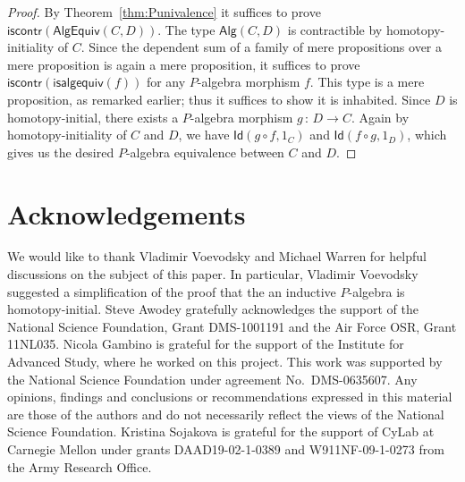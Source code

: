 \documentclass[10pt,a4paper,oneside,reqno]{amsart}
\theoremstyle{mythm}
\theoremstyle{mydef}
\theoremstyle{myrmk}
\newcommand{\co}{\,{:}\,}
\newcommand{\iscontr}{\mathsf{iscontr}}
\newcommand{\Id}{\mathsf{Id}}
\newcommand{\Palg}{\mathsf{Alg}}
\newcommand{\isalgequiv}{\mathsf{isalgequiv}}
\newcommand{\AlgEquiv}{\mathsf{AlgEquiv}}
\begin{document}
\begin{proof}
By Theorem~\ref{thm:Punivalence} it suffices to prove $\iscontr(\AlgEquiv(C,D))$. The type $\Palg(C,D)$ is contractible by homotopy-initiality of $C$. Since the dependent sum of a family of mere propositions over a mere proposition is again a mere proposition, it suffices to prove $\iscontr(\isalgequiv(f))$ for any $P$-algebra morphism $f$. This type is a mere proposition, as remarked earlier; thus it suffices to show it is inhabited.
Since $D$ is homotopy-initial, there exists a $P$-algebra morphism $g \co D \to C$. Again by homotopy-initiality of $C$ and 
$D$, we have $\Id(g \circ f, 1_C)$ and $\Id(f \circ g, 1_D)$, which gives us the desired $P$-algebra equivalence between 
$C$ and $D$.
\end{proof}



\section*{Acknowledgements}

We would like to thank Vladimir Voevodsky and Michael Warren for helpful discussions
on the subject of this paper. In particular, Vladimir Voevodsky suggested a simplification of the 
proof that the an inductive $P$-algebra is homotopy-initial.
 Steve Awodey gratefully acknowledges the support of the National Science Foundation, Grant DMS-1001191 and the Air Force OSR, Grant 11NL035. Nicola Gambino is grateful for the support of the Institute for Advanced Study, where
he worked on this project. This work was supported by the National Science Foundation 
under agreement No.\ DMS-0635607. Any opinions, findings and conclusions or recommendations
expressed in this material are those of the authors and do not necessarily reflect the views of
the National Science Foundation. Kristina Sojakova is grateful for the support of CyLab at Carnegie
Mellon under grants DAAD19-02-1-0389 and W911NF-09-1-0273 from the Army
Research Office.











                        
\end{document}
